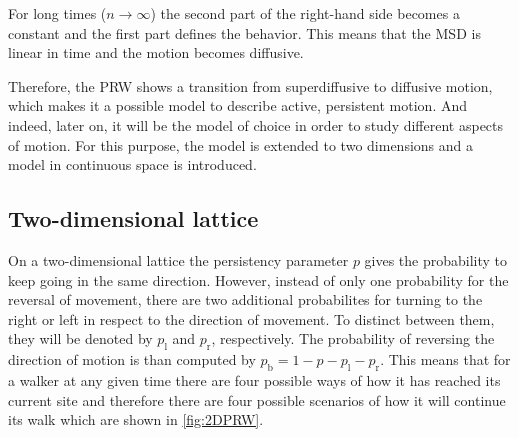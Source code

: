 For long times ($n\rightarrow \infty$) the second part of the right-hand side becomes a constant and the first part defines the behavior. This means that the \acs{MSD} is linear in time and the motion becomes diffusive.

Therefore, the \acs{PRW} shows a transition from superdiffusive to diffusive motion, which makes it a possible model to describe active, persistent motion. And indeed, later on, it will be the model of choice in order to study different aspects of motion. For this purpose, the model is extended to two dimensions and a model in continuous space is introduced.

\subsection{Two-dimensional lattice} \label{ssec:2d-lattice}
On a two-dimensional lattice the persistency parameter $p$ gives the probability to keep going in the same direction. However, instead of only one probability for the reversal of movement, there are two additional probabilites for turning to the right or left in respect to the direction of movement. To distinct between them, they will be denoted by $p_{\textrm{l}}$ and $p_{\textrm{r}}$, respectively. The probability of reversing the direction of motion is than computed by $p_{\textrm{b}} = 1 - p - p_{\textrm{l}} - p_{\textrm{r}}$. This means that for a walker at any given time there are four possible ways of how it has reached its current site and therefore there are four possible scenarios of how it will continue its walk which are shown in \autoref{fig:2DPRW}.

